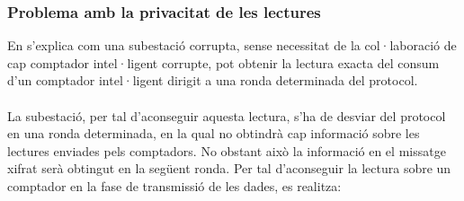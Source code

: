 \subsubsection{Problema amb la privacitat de les lectures}
En \cite{repair-busom} s'explica com una subestació corrupta, sense necessitat de la col·laboració de cap comptador intel·ligent corrupte, pot obtenir la lectura exacta del consum d'un comptador intel·ligent dirigit a una ronda determinada del protocol.
\\
\\
La subestació, per tal d'aconseguir aquesta lectura, s'ha de desviar del protocol en una ronda determinada, en la qual no obtindrà cap informació sobre les lectures enviades pels comptadors. No obstant això la informació en el missatge xifrat serà obtingut en la següent ronda. Per tal d'aconseguir la lectura sobre un comptador en la fase de transmissió de les dades, es realitza:
